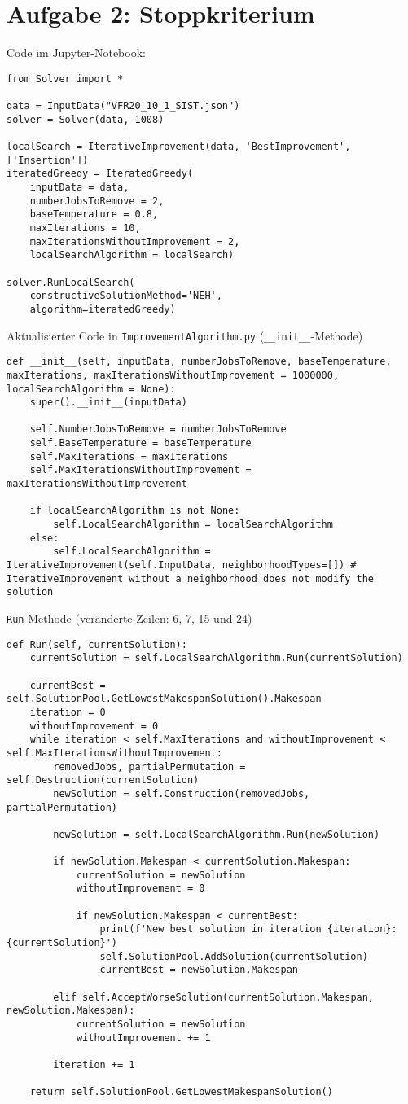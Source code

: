\documentclass{article}
\begin{document}
	\section*{Aufgabe 2: Stoppkriterium}
	Code im Jupyter-Notebook:
	\begin{lstlisting}
from Solver import *

data = InputData("VFR20_10_1_SIST.json") 
solver = Solver(data, 1008)

localSearch = IterativeImprovement(data, 'BestImprovement', ['Insertion'])
iteratedGreedy = IteratedGreedy(
	inputData = data, 
	numberJobsToRemove = 2, 
	baseTemperature = 0.8, 
	maxIterations = 10,
	maxIterationsWithoutImprovement = 2,
	localSearchAlgorithm = localSearch)

solver.RunLocalSearch(
	constructiveSolutionMethod='NEH',
	algorithm=iteratedGreedy)
	\end{lstlisting}
	Aktualisierter Code in \texttt{ImprovementAlgorithm.py} (\texttt{\_\_init\_\_}-Methode)
	\begin{lstlisting}
def __init__(self, inputData, numberJobsToRemove, baseTemperature, maxIterations, maxIterationsWithoutImprovement = 1000000, localSearchAlgorithm = None):
	super().__init__(inputData)

	self.NumberJobsToRemove = numberJobsToRemove
	self.BaseTemperature = baseTemperature
	self.MaxIterations = maxIterations
	self.MaxIterationsWithoutImprovement = maxIterationsWithoutImprovement

	if localSearchAlgorithm is not None:
		self.LocalSearchAlgorithm = localSearchAlgorithm
	else:
		self.LocalSearchAlgorithm = IterativeImprovement(self.InputData, neighborhoodTypes=[]) # IterativeImprovement without a neighborhood does not modify the solution
	\end{lstlisting}
	\texttt{Run}-Methode (veränderte Zeilen: 6, 7, 15 und 24)
	\begin{lstlisting}
def Run(self, currentSolution):
	currentSolution = self.LocalSearchAlgorithm.Run(currentSolution)

	currentBest = self.SolutionPool.GetLowestMakespanSolution().Makespan
	iteration = 0
	withoutImprovement = 0
	while iteration < self.MaxIterations and withoutImprovement < self.MaxIterationsWithoutImprovement:
		removedJobs, partialPermutation = self.Destruction(currentSolution)
		newSolution = self.Construction(removedJobs, partialPermutation)

		newSolution = self.LocalSearchAlgorithm.Run(newSolution)

		if newSolution.Makespan < currentSolution.Makespan:
			currentSolution = newSolution
			withoutImprovement = 0

			if newSolution.Makespan < currentBest:
				print(f'New best solution in iteration {iteration}: {currentSolution}')
				self.SolutionPool.AddSolution(currentSolution)
				currentBest = newSolution.Makespan

		elif self.AcceptWorseSolution(currentSolution.Makespan, newSolution.Makespan):
			currentSolution = newSolution
			withoutImprovement += 1

		iteration += 1

	return self.SolutionPool.GetLowestMakespanSolution()
	\end{lstlisting}
\end{document}
